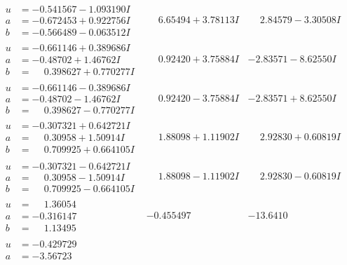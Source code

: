 \documentclass[1p]{elsarticle_modified}
\theoremstyle{definition}
\begin{document}
$$\begin{array}{c|c|c}
\begin{aligned}
u &= -0.541567 - 1.093190 I \\
a &= -0.672453 + 0.922756 I \\
b &= -0.566489 - 0.063512 I\end{aligned}
 & \phantom{-}6.65494 + 3.78113 I & \phantom{-}2.84579 - 3.30508 I \\ \hline\begin{aligned}
u &= -0.661146 + 0.389686 I \\
a &= -0.48702 + 1.46762 I \\
b &= \phantom{-}0.398627 + 0.770277 I\end{aligned}
 & \phantom{-}0.92420 + 3.75884 I & -2.83571 - 8.62550 I \\ \hline\begin{aligned}
u &= -0.661146 - 0.389686 I \\
a &= -0.48702 - 1.46762 I \\
b &= \phantom{-}0.398627 - 0.770277 I\end{aligned}
 & \phantom{-}0.92420 - 3.75884 I & -2.83571 + 8.62550 I \\ \hline\begin{aligned}
u &= -0.307321 + 0.642721 I \\
a &= \phantom{-}0.30958 + 1.50914 I \\
b &= \phantom{-}0.709925 + 0.664105 I\end{aligned}
 & \phantom{-}1.88098 + 1.11902 I & \phantom{-}2.92830 + 0.60819 I \\ \hline\begin{aligned}
u &= -0.307321 - 0.642721 I \\
a &= \phantom{-}0.30958 - 1.50914 I \\
b &= \phantom{-}0.709925 - 0.664105 I\end{aligned}
 & \phantom{-}1.88098 - 1.11902 I & \phantom{-}2.92830 - 0.60819 I \\ \hline\begin{aligned}
u &= \phantom{-}1.36054\phantom{ +0.000000I} \\
a &= -0.316147\phantom{ +0.000000I} \\
b &= \phantom{-}1.13495\phantom{ +0.000000I}\end{aligned}
 & -0.455497\phantom{ +0.000000I} & -13.6410\phantom{ +0.000000I} \\ \hline\begin{aligned}
u &= -0.429729\phantom{ +0.000000I} \\
a &= -3.56723\phantom{ +0.000000I} \\

\end{aligned}
\end{array}$$
\end{document}
